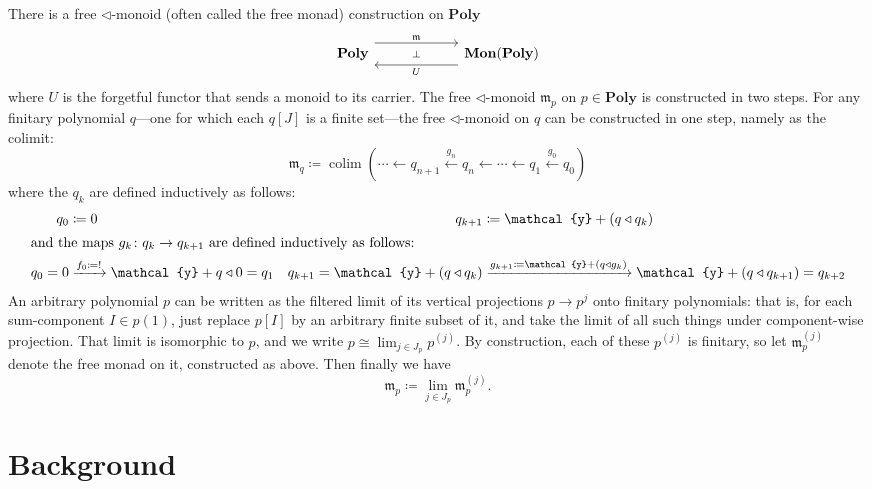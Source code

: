 \documentclass[11pt, one side, article]{memoir}
\theoremstyle{definition}
\theoremstyle{plain}
\DeclareMathOperator*{\colim}{colim}
\newcommand{\Cat}[1]{\mathbf{#1}}%
\newcommand{\To}[2][]{\xrightarrow[#1]{#2}}
\newcommand{\from}{\leftarrow}
\newcommand{\From}[1]{\xleftarrow{#1}}
\newcommand{\yon}{\mathcal{y}}
\newcommand{\poly}{\Cat{Poly}}
\newcommand{\0}{\textsf{0}}
\newcommand{\1}{\tn{\textsf{1}}}
\newcommand{\tri}{\mathbin{\triangleleft}}
\begin{document}
There is a free $\tri$-monoid (often called the free monad) construction on $\poly$
\begin{equation}
\begin{tikzcd}[column sep=60pt]
	\poly
  	\ar[from=r, shift left=8pt, "U"]
		\ar[from=r, phantom, "\scriptstyle\bot"]
  	&
	\Cat{Mon}(\poly)
		\ar[from=l, shift right=-8pt, "\mathfrak{m}"]
\end{tikzcd}
\end{equation}
where $U$ is the forgetful functor that sends a monoid to its carrier. The free $\tri$-monoid $\mathfrak{m}_p$ on $p\in\poly$ is constructed in two steps. For any finitary polynomial $q$---one for which each $q[J]$ is a finite set---the free $\tri$-monoid on $q$ can be constructed in one step, namely as the colimit:
\begin{equation}
	\mathfrak{m}_q\coloneqq\colim(\cdots\from q_{n+1}\From{g_n}q_n\from\cdots\from q_1\From{g_0} q_0)
\end{equation}
where the $q_k$ are defined inductively as follows:
\begin{align}
	q_0&\coloneqq 0&q_{k+1}&\coloneqq \yon+(q\tri q_k)\\
\intertext{and the maps $g_k\colon q_{k}\to q_{k+1}$ are defined inductively as follows:}
	q_0=0&\To{f_0\coloneqq!}\yon+q\tri 0=q_1&q_{k+1}=\yon+(q\tri q_{k})&\To{g_{k+1}\coloneqq\yon+(q\tri g_k)}\yon+(q\tri q_{k+1})=q_{k+2}
\end{align}
An arbitrary polynomial $p$ can be written as the filtered limit of its vertical projections $p\to p^{j}$ onto finitary polynomials: that is, for each sum-component $I\in p(1)$, just replace $p[I]$ by an arbitrary finite subset of it, and take the limit of all such things under component-wise projection. That limit is isomorphic to $p$, and we write $p\cong\lim_{j\in J_p}p^{(j)}$. By construction, each of these $p^{(j)}$ is finitary, so let $\mathfrak{m}_p^{(j)}$ denote the free monad on it, constructed as above. Then finally we have
\begin{equation}
	\mathfrak{m}_p\coloneqq\lim_{j\in J_p}\mathfrak{m}_p^{(j)}.
\end{equation}






\clearpage\appendix
\chapter{Background}\label{chap.background}
\end{document}
